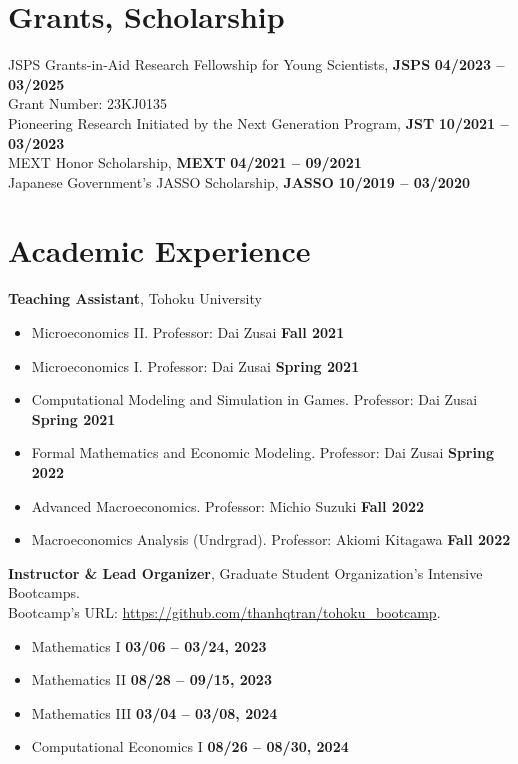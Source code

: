 \documentclass[margin,line]{res}
\begin{document}
\begin{resume}
\vspace{4mm}

\section{\sc Grants, Scholarship}
JSPS Grants-in-Aid Research Fellowship for Young Scientists, {\bf JSPS} \hfill {\bf 04/2023 -- 03/2025}\\
Grant Number: 23KJ0135 \\
Pioneering Research Initiated by the Next Generation Program, {\bf JST} \hfill {\bf 10/2021 -- 03/2023}\\
MEXT Honor Scholarship, {\bf MEXT} \hfill {\bf 04/2021 -- 09/2021}\\
Japanese Government's JASSO Scholarship, {\bf JASSO} \hfill {\bf 10/2019 -- 03/2020}\\

\vspace{4mm}

\section{\sc Academic Experience}
{\bf Teaching Assistant}, Tohoku University
\begin{itemize}
\item[ ] Microeconomics II. Professor: Dai Zusai \hfill {\bf Fall 2021}
\item[ ] Microeconomics I. Professor: Dai Zusai \hfill {\bf Spring 2021}
\item[ ] Computational Modeling and Simulation in Games. Professor: Dai Zusai \hfill {\bf Spring 2021}
\item[ ] Formal Mathematics and Economic Modeling. Professor: Dai Zusai \hfill {\bf Spring 2022}
\item[ ] Advanced Macroeconomics. Professor: Michio Suzuki \hfill {\bf Fall 2022}
\item[ ] Macroeconomics Analysis (Undrgrad). Professor: Akiomi Kitagawa \hfill {\bf Fall 2022}
\end{itemize}

{\bf Instructor \& Lead Organizer}, Graduate Student Organization's Intensive Bootcamps. \\
Bootcamp's URL: \url{https://github.com/thanhqtran/tohoku_bootcamp}.
\begin{itemize}
\item[ ] Mathematics I  \hfill {\bf 03/06 -- 03/24, 2023}
\item[ ] Mathematics II \hfill {\bf 08/28 -- 09/15, 2023}
\item[ ] Mathematics III \hfill {\bf 03/04 -- 03/08, 2024}
\item[ ] Computational Economics I \hfill {\bf 08/26 -- 08/30, 2024}
\end{itemize}


\end{resume}
\end{document}
